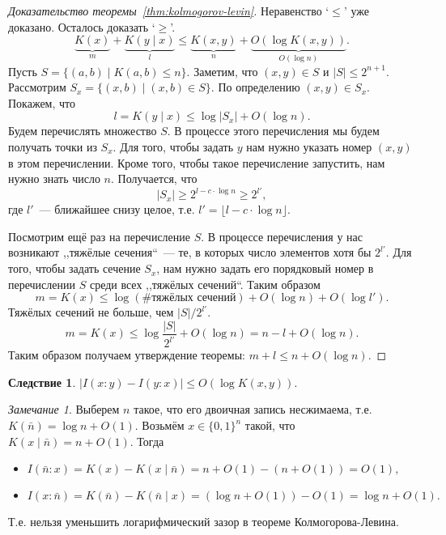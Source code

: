 \documentclass[12pt]{article}
\theoremstyle{definition}
\theoremstyle{plain}
\newtheorem{corollary}{Следствие}[section]
\theoremstyle{remark}
\newtheorem{remark}{Замечание}[section]
\begin{document}
\begin{proof}[Доказательство теоремы~\ref{thm:kolmogorov-levin}] Неравенство `$\le$' уже
    доказано. Осталось доказать `$\ge$'.
    \[
    \underbrace{K(x)}_{m} + \underbrace{K(y\mid x)}_l \le \underbrace{K(x,y)}_n
    + \underbrace{O(\log K(x,y))}_{O(\log n)}.
    \]
    Пусть $S = \{( a,b) \mid K(a,b)\le n\}$. Заметим, что $(
    x,y)\in S$ и $|S|\le 2^{n+1}$. 
    Рассмотрим $S_x = \{( x,b) \mid ( x,b) \in S\}$.
    По определению $( x,y)\in S_x$.
    Покажем, что 
    \[
        l = K(y\mid x)\le \log|S_x| + O(\log n).
    \]
    Будем перечислять множество $S$. В процессе этого перечисления мы будем
    получать точки из $S_x$. Для того, чтобы задать $y$ нам нужно указать
    номер $( x,y )$ в этом перечислении. Кроме того, чтобы такое
    перечисление запустить, нам нужно знать число $n$. Получается, что
    \[|S_x| \ge 2^{l - c\cdot\log n} \ge 2^{l'},\]
    где $l'$~--- ближайшее снизу целое, т.е. $l' = \lfloor l - c\cdot\log n\rfloor$.

    Посмотрим ещё раз на перечисление $S$. В процессе перечисления у нас
    возникают ,,тяжёлые сечения``~--- те, в которых число элементов хотя бы
    $2^{l'}$. Для того, чтобы задать сечение $S_x$, нам нужно задать его
    порядковый номер в перечислении $S$ среди всех ,,тяжёлых сечений``. Таким
    образом
    \[
        m = K(x) \le \log(\text{\# тяжёлых сечений}) + O(\log n) + O(\log l').
    \]
    Тяжёлых сечений не больше, чем $|S|/2^{l'}$.
    \[
        m = K(x) \le \log\frac{|S|}{2^{l'}} + O(\log n) = n - l + O(\log n).
    \]
    Таким образом получаем утверждение теоремы: $m + l \le n + O(\log n)$.
\end{proof}
\begin{corollary}
    $|I(x:y) - I(y:x)|\le O(\log K(x,y)).$
\end{corollary}
\begin{remark}
    Выберем $n$ такое, что его двоичная запись несжимаема, 
    т.е. $K(\bar n) = \log n + O(1)$. Возьмём $x\in\{0,1\}^n$ такой, что
    $K(x\mid \bar n) = n + O(1).$ Тогда
    \begin{itemize}
    \item\(
        I(\bar n : x) = K(x) - K(x\mid\bar n) = n + O(1) - (n + O(1)) = O(1),
    \)
    \item\(
        I(x : \bar n) = K(\bar n) - K(\bar n\mid x) = (\log n + O(1)) - O(1) = \log n + O(1).
    \)
    \end{itemize}
    Т.е. нельзя уменьшить логарифмический зазор в теореме Колмогорова-Левина.
\end{remark}
\end{document}
